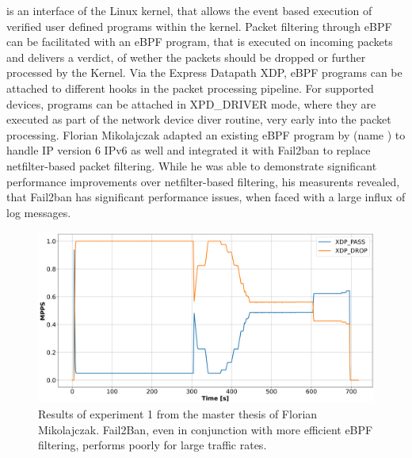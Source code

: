 is an interface of the Linux kernel, that allows the event based execution of verified user defined programs within the kernel. Packet filtering through \ac{eBPF} can be facilitated with an \ac{eBPF} program,
that is executed on incoming packets and delivers a verdict, of wether the packets should be dropped or further processed by the Kernel. Via the Express Datapath \ac{XDP}, \ac{eBPF} programs can be attached to different hooks in 
the packet processing pipeline. For supported devices, programs can be attached in XPD\_DRIVER mode, where they are executed as part of the network device diver routine, very early into the packet processing. Florian Mikolajczak adapted an existing \ac{eBPF} program by (name \cite{}) to handle
IP version 6 \ac{IPv6} as well and integrated it with Fail2ban to replace netfilter-based packet filtering. While he was able to demonstrate significant performance improvements over netfilter-based filtering, his measurents 
revealed, that Fail2ban has significant performance issues, when faced with a large influx of log messages. 

\begin{figure}[h!]
	\label{fig:fail2ban:mikolajczak2022}
	\centering
	\scriptsize
    \centerline{\includegraphics[width=1.2\textwidth]{images/Fail2Ban2.png}}
    \caption[Fail2ban measurement by \cite{mikolajczak2022}]{Results of experiment 1 from the  master thesis of Florian Mikolajczak\cite{mikolajczak2022}. Fail2Ban, even in conjunction with more efficient \ac{eBPF} filtering, performs poorly for large traffic rates.}
\end{figure}

